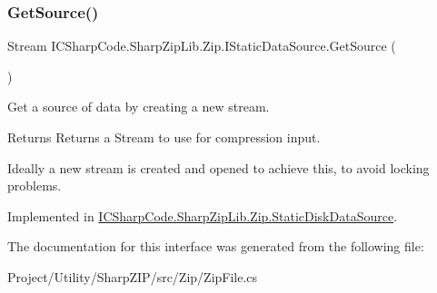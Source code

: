 \subsubsection{\texorpdfstring{Get\+Source()}{GetSource()}}
{\footnotesize\ttfamily Stream I\+C\+Sharp\+Code.\+Sharp\+Zip\+Lib.\+Zip.\+I\+Static\+Data\+Source.\+Get\+Source (\begin{DoxyParamCaption}{ }\end{DoxyParamCaption})}



Get a source of data by creating a new stream. 

\begin{DoxyReturn}{Returns}
Returns a Stream to use for compression input.
\end{DoxyReturn}


Ideally a new stream is created and opened to achieve this, to avoid locking problems.

Implemented in \hyperlink{class_i_c_sharp_code_1_1_sharp_zip_lib_1_1_zip_1_1_static_disk_data_source_a7de7990a0523c247bab40aa1ef0a3474}{I\+C\+Sharp\+Code.\+Sharp\+Zip\+Lib.\+Zip.\+Static\+Disk\+Data\+Source}.



The documentation for this interface was generated from the following file\+:\begin{DoxyCompactItemize}
\item 
Project/\+Utility/\+Sharp\+Z\+I\+P/src/\+Zip/Zip\+File.\+cs\end{DoxyCompactItemize}
